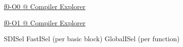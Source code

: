 
\begin{frame}{}
\end{frame}

\begin{frame}{}
  \begin{center}

  \end{center}
\end{frame}

\begin{frame}{}
  \begin{center}
    \href{https://godbolt.org/z/4jbbabM6x}{f0-O0 @ Compiler Explorer}
  \end{center}
\end{frame}

\begin{frame}{}
  \begin{center}
    \href{https://godbolt.org/z/c7PrEK4c7}{f0-O1 @ Compiler Explorer}
  \end{center}
\end{frame}

\begin{frame}{}
  \begin{center}
    SDISel \quad FastISel (per basic block) \quad GlobalISel (per function)

  \end{center}
\end{frame}
